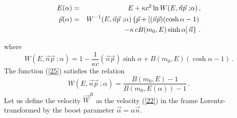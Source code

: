 \documentclass[a4paper,12pt]{article}
\begin{document}
\renewcommand{\theequation}{24.\alph{equation}}
\setcounter{equation}{0}
\begin{eqnarray}\label{24a}
E( \alpha )& = & E + \kappa c^2 \ln W(E, \vec{n} \vec{p}{\ ;}
\alpha )\, ,
\\
\label{24b} \vec{p}(\alpha)& = & W^{-1} (E, \vec{n} \vec{p}{\
;}\alpha) \left\{ \vec{p} + \left[ (\vec{n}\vec{p})(\cosh \alpha -
1 )\right.\right. \cr && \left. \left. - \kappa \, c B(m_0 , E)
\sinh \alpha\right]\vec{n}\right\}\, .
\end{eqnarray}

\renewcommand{\theequation}{\arabic{equation}}
\setcounter{equation}{24} where
\begin{equation}\label{25}
  W(E, \vec{n}\vec{p}{\ ;} \alpha)
  = 1 - \frac{1}{\kappa c} (\vec{n}\vec{p})\sinh \alpha +
  B( m_0 , E) ( \cosh \alpha - 1)\, .
\end{equation}
The function (\ref{25}) satisfies the relation
\begin{equation}\label{26}
  W(E, \vec{n}\vec{p}{\ ;}\alpha)
  = \frac{B(m_0 , E)- 1}{B(m_0 , E(\alpha))-1}\, .
\end{equation}
Let us define the velocity $ \vec{W}^R$ as the velocity (\ref{22})
in the frame Lorentz-transformed by the boost parameter $
\vec{\alpha}= \alpha \vec{n}$.
\end{document}
